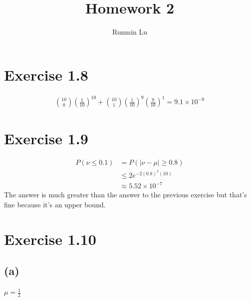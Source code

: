 \documentclass{article}
\title{Homework 2}
\author{Runmin Lu}
\begin{document}
	\maketitle
	
	\section*{Exercise 1.8}
		\begin{align*}
			{10 \choose 0} (\frac1{10})^{10} + {10 \choose 1} (\frac1{10})^9(\frac9{10})^1 = \boxed{9.1 \times 10^{-9}}
		\end{align*}

	\section*{Exercise 1.9}
		\begin{align*}
			P(\nu \leq 0.1) &= P(|\nu - \mu| \geq 0.8)\\
			&\leq 2e^{-2(0.8)^2(10)}\\
			&\approx \boxed{5.52 \times 10^{-7}}
		\end{align*}
		The answer is much greater than the answer to the previous exercise but that's fine because it's an upper bound.
		
	\section*{Exercise 1.10}
	\subsection*{(a)}
		$\mu = \frac12$
\end{document}
